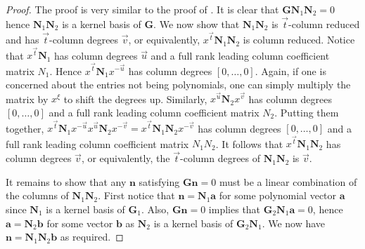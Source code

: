 \begin{proof}
The proof is very similar to the proof of .
It is clear that $\mathbf{G}\mathbf{N}_{1}\mathbf{N}_{2}=0$ hence
$\mathbf{N}_{1}\mathbf{N}_{2}$ is a kernel basis of $\mathbf{G}$.
We now show that $\mathbf{N}_{1}\mathbf{N}_{2}$ is $\vec{t}$-column
reduced and has $\vec{t}$-column degrees $\vec{v}$, or equivalently,
$x^{\vec{t}}\mathbf{N}_{1}\mathbf{N}_{2}$ is column reduced. Notice
that $x^{\vec{t}}\mathbf{N}_{1}$ has column degrees $\vec{u}$ and
a full rank leading column coefficient matrix $N_{1}$. Hence $x^{\vec{t}}\mathbf{N}_{1}x^{-\vec{u}}$
has column degrees $\left[0,\dots,0\right]$. Again, if one is concerned
about the entries not being polynomials, one can simply multiply the
matrix by $x^{\xi}$ to shift the degrees up. Similarly, $x^{\vec{u}}\mathbf{N}_{2}x^{\vec{v}}$
has column degrees $\left[0,\dots,0\right]$ and a full rank leading
column coefficient matrix $N_{2}$. Putting them together, $x^{\vec{t}}\mathbf{N}_{1}x^{-\vec{u}}x^{\vec{u}}\mathbf{N}_{2}x^{-\vec{v}}=x^{\vec{t}}\mathbf{N}_{1}\mathbf{N}_{2}x^{-\vec{v}}$
has column degrees $[0,\dots,0]$ and a full rank leading column coefficient
matrix $N_{1}N_{2}$. It follows that $x^{\vec{t}}\mathbf{N}_{1}\mathbf{N}_{2}$
has column degrees $\vec{v}$, or equivalently, the $\vec{t}$-column
degrees of $\mathbf{N}_{1}\mathbf{N}_{2}$ is $\vec{v}$.

It remains to show that any $\mathbf{n}$ satisfying $\mathbf{G}\mathbf{n}=0$
must be a linear combination of the columns of $\mathbf{N}_{1}\mathbf{N}_{2}$.
First notice that $\mathbf{n}=\mathbf{N}_{1}\mathbf{a}$ for some
polynomial vector $\mathbf{a}$ since $\mathbf{N}_{1}$ is a kernel
basis of $\mathbf{G}_{1}$. Also, $\mathbf{G}\mathbf{n}=0$ implies
that $\mathbf{G}_{2}\mathbf{N}_{1}\mathbf{a}=0$, hence $\mathbf{a}=\mathbf{N}_{2}\mathbf{b}$
for some vector $\mathbf{b}$ as $\mathbf{N}_{2}$ is a kernel basis
of $\mathbf{G}_{2}\mathbf{N}_{1}$. We now have $\mathbf{n}=\mathbf{N}_{1}\mathbf{N}_{2}\mathbf{b}$
as required.\end{proof}
